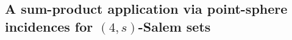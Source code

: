\documentclass{article}
\def\dung#1{\noindent
\textcolor{magenta}
{\textsc{(Dung:}
\textsf{#1})}}
\begin{document}





\subsection{A sum-product application via point-sphere incidences for $(4,s)$-Salem sets}
\label{sec:sum-product-salem}
\end{document}
